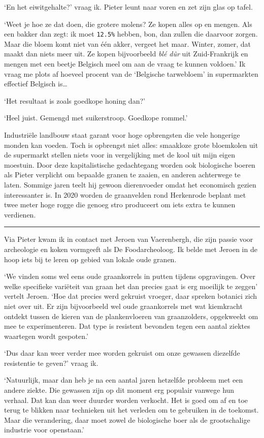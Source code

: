 \documentclass[
  11pt,
  dutch,
]{memoir}
\begin{document}
`En het eiwitgehalte?' vraag ik. Pieter leunt naar voren en zet zijn
glas op tafel.

`Weet je hoe ze dat doen, die grotere molens? Ze kopen alles op en
mengen. Als een bakker dan zegt: ik moet \texttt{12.5\%} hebben, bon,
dan zullen die daarvoor zorgen. Maar die bloem komt niet van één akker,
vergeet het maar. Winter, zomer, dat maakt dan niets meer uit. Ze kopen
bijvoorbeeld \emph{blé dûr} uit Zuid-Frankrijk en mengen met een beetje
Belgisch meel om aan de vraag te kunnen voldoen.' Ik vraag me plots af
hoeveel procent van de `Belgische tarwebloem' in supermarkten effectief
Belgisch is\ldots{}

`Het resultaat is zoals goedkope honing dan?'

`Heel juist. Gemengd met suikerstroop. Goedkope rommel.'

Industriële landbouw staat garant voor hoge opbrengsten die vele
hongerige monden kan voeden. Toch is opbrengst niet alles: smaakloze
grote bloemkolen uit de supermarkt stellen niets voor in vergelijking
met de kool uit mijn eigen moestuin. Door deze kapitalistische
gedachtegang worden ook biologische boeren als Pieter verplicht om
bepaalde granen te zaaien, en anderen achterwege te laten. Sommige jaren
teelt hij gewoon dierenvoeder omdat het economisch gezien interessanter
is. In 2020 worden de graanvelden rond Herkenrode beplant met twee meter
hoge rogge die genoeg stro produceert om iets extra te kunnen verdienen.

\pfbreak

Via Pieter kwam ik in contact met Jeroen van Vaerenbergh, die zijn
passie voor archeologie en koken vormgeeft als De Foodarcheoloog. Ik
belde met Jeroen in de hoop iets bij te leren op gebied van lokale oude
granen.

`We vinden soms wel eens oude graankorrels in putten tijdens
opgravingen. Over welke specifieke variëteit van graan het dan precies
gaat is erg moeilijk te zeggen' vertelt Jeroen. `Hoe dat precies werd
gekruist vroeger, daar spreken botanici zich niet over uit. Er zijn
bijvoorbeeld wel oude graankorrels met wat kiemkracht ontdekt tussen de
kieren van de plankenvloeren van graanzolders, opgekweekt om mee te
experimenteren. Dat type is resistent bevonden tegen een aantal ziektes
waartegen wordt gespoten.'

`Dus daar kan weer verder mee worden gekruist om onze gewassen diezelfde
resistentie te geven?' vraag ik.

`Natuurlijk, maar dan heb je na een aantal jaren hetzelfde probleem met
een andere ziekte. Die gewassen zijn op dit moment erg populair vanwege
hun verhaal. Dat kan dan weer duurder worden verkocht. Het is goed om af
en toe terug te blikken naar technieken uit het verleden om te gebruiken
in de toekomst. Maar die verandering, daar moet zowel de biologische
boer als de grootschalige industrie voor openstaan.'
\end{document}
